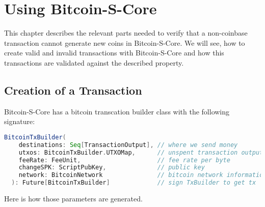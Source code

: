 \chapter{Using Bitcoin-S-Core}
\label{chap:using_bitcoins}
This chapter describes the relevant parts needed to verify that a non-coinbase transaction cannot generate new coins in Bitcoin-S-Core.
We will see, how to create valid and invalid transactions with Bitcoin-S-Core and how this transactions are validated against the described property.

\section{Creation of a Transaction}
Bitcoin-S-Core has a bitcoin transcation builder class with the following signature:
\begin{lstlisting}[language=scala]
  BitcoinTxBuilder(
    destinations: Seq[TransactionOutput], // where we send money
    utxos: BitcoinTxBuilder.UTXOMap,      // unspent transaction outputs
    feeRate: FeeUnit,                     // fee rate per byte
    changeSPK: ScriptPubKey,              // public key
    network: BitcoinNetwork               // bitcoin network information
  ): Future[BitcoinTxBuilder]             // sign TxBuilder to get tx
\end{lstlisting}
Here is how those parameters are generated.

